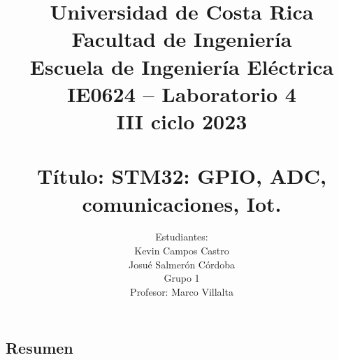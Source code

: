 \documentclass[12pt,a4paper]{article}
\author{Estudiantes:\\ Kevin Campos Castro\\ Josué Salmerón Córdoba  \\{\small Grupo 1}\\ Profesor:  Marco Villalta  \vspace*{3.0in}}
\title{Universidad de Costa Rica\\{\small Facultad de Ingeniería\\Escuela de Ingeniería Eléctrica\\IE0624 – Laboratorio 4\\III ciclo 2023\\\vspace*{0.55in}}\\ Título: STM32: GPIO, ADC, comunicaciones, Iot. \vspace*{1.35in}}
\begin{document}
 

\maketitle  
\thispagestyle{empty}%
\renewcommand{\thepage}{\roman{page}}
\newpage
\tableofcontents
\newpage
\listoffigures 
\newpage
\listoftables  
\newpage
\renewcommand{\thepage}{\arabic{page}} 
\setcounter{page}{1}
\begin{center}
\section{Resumen}
\end{center}


   
\newpage  


%





\newpage 


 
\end{document}
